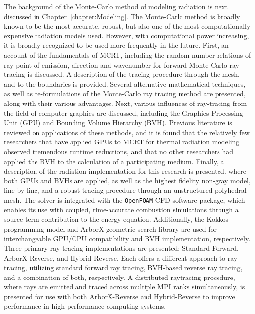 The background of the Monte-Carlo method of modeling radiation is next discussed in Chapter~\ref{chapter:Modeling}. The Monte-Carlo method is broadly known to be the most accurate, robust, but also one of the most computationally expensive radiation models used.
However, with computational power increasing, it is broadly recognized to be used more frequently in the future. First, an account of the fundamentals of MCRT, including the random number relations of ray point of emission, direction and wavenumber for forward Monte-Carlo ray tracing is discussed.
A description of the tracing procedure through the mesh, and to the boundaries is provided.
Several alternative mathematical techniques, as well as re-formulations of the Monte-Carlo ray tracing method are presented, along with their various advantages. Next, various influences of ray-tracing from the field of computer graphics are discussed, including the Graphics Processing Unit (GPU) and Bounding Volume Hierarchy (BVH).
Previous literature is reviewed on applications of these methods, and it is found that the relatively few researchers that have applied GPUs to MCRT for thermal radiation modeling observed tremendous runtime reductions, and that no other researchers had applied the BVH to the calculation of a participating medium.
Finally, a description of the radiation implementation for this research is presented, where both GPUs and BVHs are applied, as well as the highest fidelity non-gray model, line-by-line, and a robust tracing procedure through an unstructured polyhedral mesh.
The solver is integrated with the \verb|OpenFOAM| CFD software package, which enables its use with coupled, time-accurate combustion simulations through a source term contribution to the energy equation. Additionally, the Kokkos programming model and ArborX geometric search library are used for interchangeable GPU/CPU compatibility and BVH implementation, respectively. Three primary ray tracing implementations are presented: Standard-Forward, ArborX-Reverse, and Hybrid-Reverse. Each offers a different approach to ray tracing, utilizing standard forward ray tracing, BVH-based reverse ray tracing, and a combination of both, respectively. A distributed raytracing procedure, where rays are emitted and traced across multiple MPI ranks simultaneously, is presented for use with both ArborX-Reverse and Hybrid-Reverse to improve performance in high performance computing systems.

